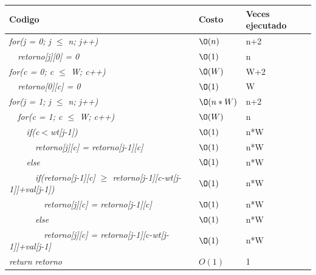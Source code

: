 \documentclass[spanish]{article}
\begin{document}
	\begin{center}
		\begin{table}[H]
			\begin{tabular}{|l|l|l|}
				\hline
				\rowcolor[HTML]{FFCC67} 
				Codigo                           & Costo & Veces ejecutado \\ \hline
				\textit{for(j = 0; j $\leq$ n; j++)}                    & $\O(n)$    & n+2               \\ \hline
				\textit{\  \  retorno[j][0] = 0}                    & $\O(1)$    & n               \\ \hline
				\textit{for(c = 0; c $\leq$ W; c++)}                    & $\O(W)$    & W+2               \\ \hline
				\textit{\  \  retorno[0][c] = 0}                    & $\O(1)$    & W               \\ \hline
				\textit{for(j = 1; j $\leq$ n; j++)}                    & $\O(n*W)$    & n+2               \\ \hline 					
				\textit{\  \  for(c = 1; c $\leq$ W; c++)}                    & $\O(W)$    & n               \\ \hline 
				\textit{\  \  \  \  if(c$<$wt[j-1])}                    & $\O(1)$    & n*W               \\ \hline 
				\textit{\  \  \  \  \  \  retorno[j][c] = retorno[j-1][c]}                    & $\O(1)$    & n*W               \\ \hline 
				\textit{\  \  \  \  else}                    & $\O(1)$    & n*W               \\ \hline 
				\textit{\  \  \  \  \  \  if(retorno[j-1][c] $\geq$ retorno[j-1][c-wt[j-1]]+val[j-1])}                    & $\O(1)$    & n*W               \\ \hline
				\textit{\  \  \  \  \  \  \  \  retorno[j][c] = retorno[j-1][c]}                    & $\O(1)$    & n*W               \\ \hline	
				\textit{\  \  \  \  \  \  else}                    & $\O(1)$    & n*W               \\ \hline
				\textit{\  \  \  \  \  \  \  \  retorno[j][c] = retorno[j-1][c-wt[j-1]]+val[j-1]}                    & $\O(1)$    & n*W               \\ \hline							
				\textit{return retorno}                    & $O(1)$    & 1               \\ \hline 				
			\end{tabular}
		\end{table}										
	\end{center}
\end{document}
